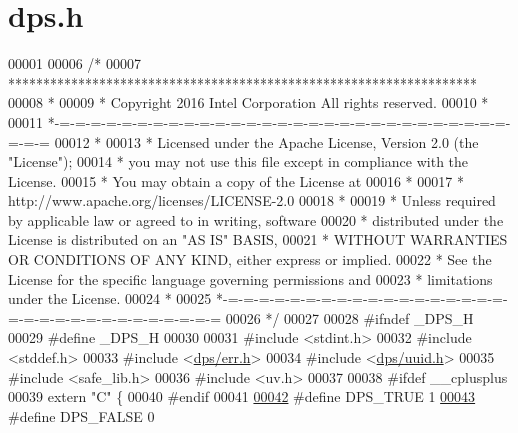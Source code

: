 \hypertarget{dps_8h_source}{}\section{dps.\+h}
\label{dps_8h_source}

\begin{DoxyCode}
00001 
00006 \textcolor{comment}{/*}
00007 \textcolor{comment}{ *******************************************************************}
00008 \textcolor{comment}{ *}
00009 \textcolor{comment}{ * Copyright 2016 Intel Corporation All rights reserved.}
00010 \textcolor{comment}{ *}
00011 \textcolor{comment}{ *-=-=-=-=-=-=-=-=-=-=-=-=-=-=-=-=-=-=-=-=-=-=-=-=-=-=-=-=-=-=-=-=}
00012 \textcolor{comment}{ *}
00013 \textcolor{comment}{ * Licensed under the Apache License, Version 2.0 (the "License");}
00014 \textcolor{comment}{ * you may not use this file except in compliance with the License.}
00015 \textcolor{comment}{ * You may obtain a copy of the License at}
00016 \textcolor{comment}{ *}
00017 \textcolor{comment}{ *      http://www.apache.org/licenses/LICENSE-2.0}
00018 \textcolor{comment}{ *}
00019 \textcolor{comment}{ * Unless required by applicable law or agreed to in writing, software}
00020 \textcolor{comment}{ * distributed under the License is distributed on an "AS IS" BASIS,}
00021 \textcolor{comment}{ * WITHOUT WARRANTIES OR CONDITIONS OF ANY KIND, either express or implied.}
00022 \textcolor{comment}{ * See the License for the specific language governing permissions and}
00023 \textcolor{comment}{ * limitations under the License.}
00024 \textcolor{comment}{ *}
00025 \textcolor{comment}{ *-=-=-=-=-=-=-=-=-=-=-=-=-=-=-=-=-=-=-=-=-=-=-=-=-=-=-=-=-=-=-=-=}
00026 \textcolor{comment}{ */}
00027 
00028 \textcolor{preprocessor}{#ifndef \_DPS\_H}
00029 \textcolor{preprocessor}{#define \_DPS\_H}
00030 
00031 \textcolor{preprocessor}{#include <stdint.h>}
00032 \textcolor{preprocessor}{#include <stddef.h>}
00033 \textcolor{preprocessor}{#include <\hyperlink{err_8h}{dps/err.h}>}
00034 \textcolor{preprocessor}{#include <\hyperlink{uuid_8h}{dps/uuid.h}>}
00035 \textcolor{preprocessor}{#include <safe\_lib.h>}
00036 \textcolor{preprocessor}{#include <uv.h>}
00037 
00038 \textcolor{preprocessor}{#ifdef \_\_cplusplus}
00039 \textcolor{keyword}{extern} \textcolor{stringliteral}{"C"} \{
00040 \textcolor{preprocessor}{#endif}
00041 
\hyperlink{dps_8h_a4a173ed2665cea74e58558d99b377ab3}{00042} \textcolor{preprocessor}{#define DPS\_TRUE  1 }
\hyperlink{dps_8h_ad8b397975a479b996ef223367d8835a9}{00043} \textcolor{preprocessor}{#define DPS\_FALSE 0 }

\end{DoxyCode}
